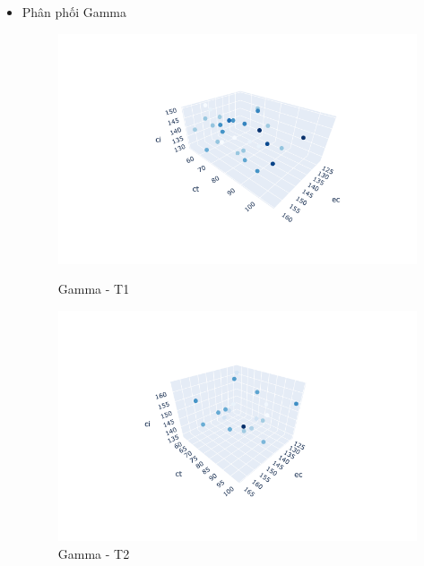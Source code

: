 \documentclass{hust}
\begin{document}
\begin{itemize}
	\item Phân phối Gamma
	\begin{figure}[H]
		\begin{minipage}{0.5\textwidth}
			\centering
			\includegraphics[width=1.2\linewidth]{images/ga-dem1.png}
			\caption{Gamma - T1}\label{fig:nsga-ii-ga-dem1}
		\end{minipage}\hfill
		\begin{minipage}{0.5\textwidth}
			\centering
			\includegraphics[width=1.2\linewidth]{images/ga-dem2.png}
			\caption{Gamma - T2}\label{fig:nsga-ii-ga-dem2}
		\end{minipage}
	\end{figure}
	

\end{itemize}
\end{document}
